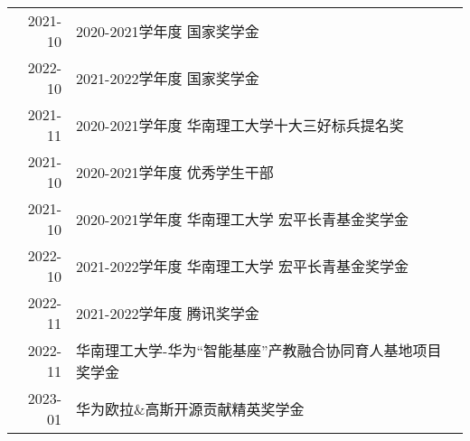 
\begin{tabular}{rl}	
	2021-10 & 2020-2021学年度 \enspace 国家奖学金 \\
	2022-10 & 2021-2022学年度 \enspace 国家奖学金 \\
	2021-11 & 2020-2021学年度 \enspace 华南理工大学十大三好标兵提名奖 \\
	2021-10 & 2020-2021学年度 \enspace 优秀学生干部 \\
	2021-10 & 2020-2021学年度 \enspace 华南理工大学 宏平长青基金奖学金 \\
	2022-10 & 2021-2022学年度 \enspace 华南理工大学 宏平长青基金奖学金 \\
	2022-11 & 2021-2022学年度 \enspace 腾讯奖学金 \\
	2022-11 & 华南理工大学-华为“智能基座”产教融合协同育人基地项目奖学金 \\
	2023-01 & 华为欧拉\&高斯开源贡献精英奖学金 \\
\end{tabular}
